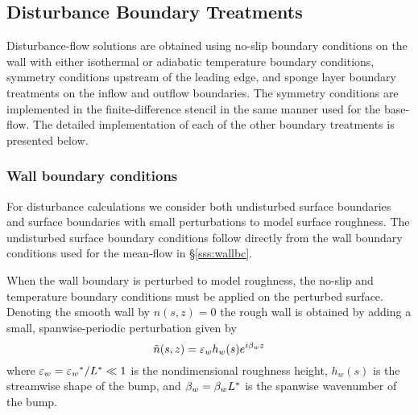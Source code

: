 \subsection{Disturbance Boundary Treatments \label{ss:distbc}}

Disturbance-flow solutions are obtained using no-slip boundary conditions on
the wall with either isothermal or adiabatic temperature boundary conditions,
symmetry conditions upstream of the leading edge, and sponge layer boundary
treatments on the inflow and outflow boundaries.  The symmetry conditions are
implemented in the finite-difference stencil in the same manner used for the
base-flow.  The detailed implementation of each of the other boundary
treatments is presented below.

\subsubsection{Wall boundary conditions \label{sss:distwallbc} }

For disturbance calculations we consider both undisturbed surface boundaries
and surface boundaries with small perturbations to model surface roughness.
The undisturbed surface boundary conditions follow directly from the wall
boundary conditions used for the mean-flow in \S\ref{sss:wallbc}.

When the wall boundary is perturbed to model roughness, the no-slip and
temperature boundary conditions must be applied on the perturbed surface.
Denoting the smooth wall by $n(s,z)=0$ the rough wall is obtained by adding a
small, spanwise-periodic perturbation given by
%
\begin{equation}
  \tilde n(s,z) = {\varepsilon_w} h_w(s) e^{i {\beta_{w}} z}
\end{equation}
%
where ${\varepsilon_w} = {\varepsilon_w}^* / L^* \ll 1$ is the nondimensional roughness height,
$h_w(s)$ is the streamwise shape of the bump, and ${\beta_{w}} = {\beta_{w}} L^*$ is the
spanwise wavenumber of the bump.

